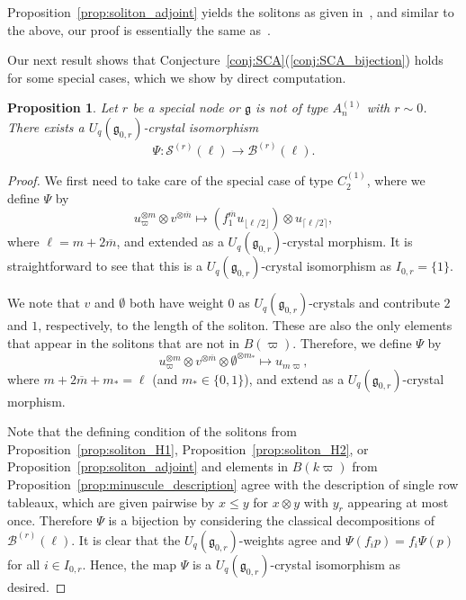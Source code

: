 \documentclass[reqno]{amsart}
\newcommand{\g}{\mathfrak{g}}
\newcommand{\Sol}{\mathcal{S}} %
\theoremstyle{plain}
\newtheorem{prop}[thm]{Proposition}
\theoremstyle{definition}
\numberwithin{equation}{section}
\begin{document}
Proposition~\ref{prop:soliton_adjoint} yields the solitons as given in~\cite[Prop.~8]{MOW12}, and similar to the above, our proof is essentially the same as~\cite[Prop.~8]{MOW12}.

Our next result shows that Conjecture~\ref{conj:SCA}(\ref{conj:SCA_bijection}) holds for some special cases, which we show by direct computation.

\begin{prop}
\label{prop:soliton_crystal_bijection}
Let $r$ be a special node or $\g$ is not of type $A_n^{(1)}$ with $r \sim 0$.
There exists a $U_q(\g_{0,r})$-crystal isomorphism
\[
\Psi \colon \Sol^{(r)}(\ell) \to \mathcal{B}^{(r)}(\ell).
\]
\end{prop}

\begin{proof}
We first need to take care of the special case of type $C_2^{(1)}$, where we define $\Psi$ by
\[
u_{\varpi}^{\otimes m} \otimes v^{\otimes \overline{m}} \mapsto (f_1^{\overline{m}} u_{\lfloor \ell/2 \rfloor}) \otimes u_{\lceil \ell/2 \rceil},
\]
where $\ell = m + 2\overline{m}$, and extended as a $U_q(\g_{0,r})$-crystal morphism.
It is straightforward to see that this is a $U_q(\g_{0,r})$-crystal isomorphism as $I_{0,r} = \{1\}$.

We note that $v$ and $\emptyset$ both have weight $0$ as $U_q(\g_{0,r})$-crystals and contribute $2$ and $1$, respectively, to the length of the soliton.
These are also the only elements that appear in the solitons that are not in $B(\varpi)$.
Therefore, we define $\Psi$ by
\[
u_{\varpi}^{\otimes m} \otimes v^{\otimes \overline{m}} \otimes \emptyset^{\otimes m_*} \mapsto u_{m\varpi},
\]
where $m + 2\overline{m} + m_* = \ell$ (and $m_* \in \{0, 1\}$), and extend as a $U_q(\g_{0,r})$-crystal morphism.

Note that the defining condition of the solitons from Proposition~\ref{prop:soliton_H1}, Proposition~\ref{prop:soliton_H2}, or Proposition~\ref{prop:soliton_adjoint} and elements in $B(k\varpi)$ from Proposition~\ref{prop:minuscule_description} agree with the description of single row tableaux, which are given pairwise by $x \leq y$ for $x \otimes y$ with $y_r$ appearing at most once.
Therefore $\Psi$ is a bijection by considering the classical decompositions of $\mathcal{B}^{(r)}(\ell)$.
It is clear that the $U_q(\g_{0,r})$-weights agree and $\Psi(f_i p) = f_i \Psi(p)$ for all $i \in I_{0,r}$.
Hence, the map $\Psi$ is a $U_q(\g_{0,r})$-crystal isomorphism as desired.
\end{proof}
\end{document}

